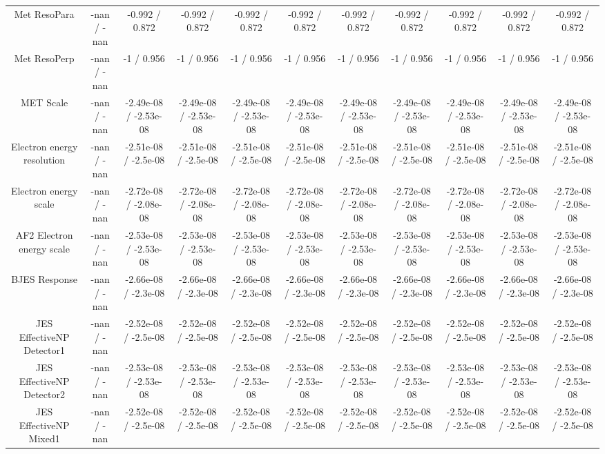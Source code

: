 \begin{table}[htbp]
\begin{center}
\begin{tabular}{|c|c|c|c|c|c|c|c|c|c|c|}
  Met ResoPara & -nan / -nan & -0.992 / 0.872 & -0.992 / 0.872 & -0.992 / 0.872 & -0.992 / 0.872 & -0.992 / 0.872 & -0.992 / 0.872 & -0.992 / 0.872 & -0.992 / 0.872 & -0.992 / 0.872 \\ 
  Met ResoPerp & -nan / -nan & -1 / 0.956 & -1 / 0.956 & -1 / 0.956 & -1 / 0.956 & -1 / 0.956 & -1 / 0.956 & -1 / 0.956 & -1 / 0.956 & -1 / 0.956 \\ 
  MET Scale & -nan / -nan & -2.49e-08 / -2.53e-08 & -2.49e-08 / -2.53e-08 & -2.49e-08 / -2.53e-08 & -2.49e-08 / -2.53e-08 & -2.49e-08 / -2.53e-08 & -2.49e-08 / -2.53e-08 & -2.49e-08 / -2.53e-08 & -2.49e-08 / -2.53e-08 & -2.49e-08 / -2.53e-08 \\ 
  Electron energy resolution & -nan / -nan & -2.51e-08 / -2.5e-08 & -2.51e-08 / -2.5e-08 & -2.51e-08 / -2.5e-08 & -2.51e-08 / -2.5e-08 & -2.51e-08 / -2.5e-08 & -2.51e-08 / -2.5e-08 & -2.51e-08 / -2.5e-08 & -2.51e-08 / -2.5e-08 & -2.51e-08 / -2.5e-08 \\ 
  Electron energy scale & -nan / -nan & -2.72e-08 / -2.08e-08 & -2.72e-08 / -2.08e-08 & -2.72e-08 / -2.08e-08 & -2.72e-08 / -2.08e-08 & -2.72e-08 / -2.08e-08 & -2.72e-08 / -2.08e-08 & -2.72e-08 / -2.08e-08 & -2.72e-08 / -2.08e-08 & -2.72e-08 / -2.08e-08 \\ 
  AF2 Electron energy scale & -nan / -nan & -2.53e-08 / -2.53e-08 & -2.53e-08 / -2.53e-08 & -2.53e-08 / -2.53e-08 & -2.53e-08 / -2.53e-08 & -2.53e-08 / -2.53e-08 & -2.53e-08 / -2.53e-08 & -2.53e-08 / -2.53e-08 & -2.53e-08 / -2.53e-08 & -2.53e-08 / -2.53e-08 \\ 
  BJES Response & -nan / -nan & -2.66e-08 / -2.3e-08 & -2.66e-08 / -2.3e-08 & -2.66e-08 / -2.3e-08 & -2.66e-08 / -2.3e-08 & -2.66e-08 / -2.3e-08 & -2.66e-08 / -2.3e-08 & -2.66e-08 / -2.3e-08 & -2.66e-08 / -2.3e-08 & -2.66e-08 / -2.3e-08 \\ 
  JES EffectiveNP Detector1 & -nan / -nan & -2.52e-08 / -2.5e-08 & -2.52e-08 / -2.5e-08 & -2.52e-08 / -2.5e-08 & -2.52e-08 / -2.5e-08 & -2.52e-08 / -2.5e-08 & -2.52e-08 / -2.5e-08 & -2.52e-08 / -2.5e-08 & -2.52e-08 / -2.5e-08 & -2.52e-08 / -2.5e-08 \\ 
  JES EffectiveNP Detector2 & -nan / -nan & -2.53e-08 / -2.53e-08 & -2.53e-08 / -2.53e-08 & -2.53e-08 / -2.53e-08 & -2.53e-08 / -2.53e-08 & -2.53e-08 / -2.53e-08 & -2.53e-08 / -2.53e-08 & -2.53e-08 / -2.53e-08 & -2.53e-08 / -2.53e-08 & -2.53e-08 / -2.53e-08 \\ 
  JES EffectiveNP Mixed1 & -nan / -nan & -2.52e-08 / -2.5e-08 & -2.52e-08 / -2.5e-08 & -2.52e-08 / -2.5e-08 & -2.52e-08 / -2.5e-08 & -2.52e-08 / -2.5e-08 & -2.52e-08 / -2.5e-08 & -2.52e-08 / -2.5e-08 & -2.52e-08 / -2.5e-08 & -2.52e-08 / -2.5e-08 \\ 

\end{tabular}
\end{center}
\end{table}

